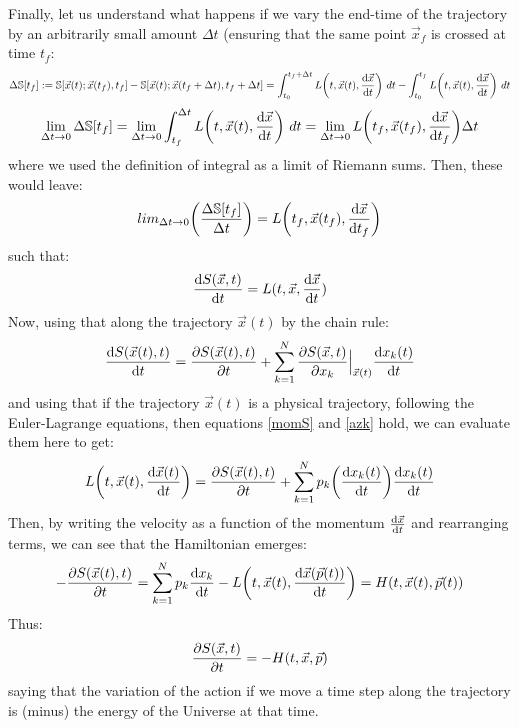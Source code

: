 \documentclass[11pt, a4paper]{article} %
\newcommand{\s}{\mathbb{S}}
\begin{document}
Finally, let us understand what happens if we vary the end-time of the trajectory by an arbitrarily small amount $\Delta t$ (ensuring that the same point $\vec{x}_f$ is crossed at time $t_f$:
\begin{equation}
\Delta \s[t_f]:=\s[\vec{x}(t); \vec{x}(t_f),t_f]-\s[\vec{x}(t); \vec{x}(t_f+\Delta t), t_f+\Delta t]=\int_{t_0}^{t_f+\Delta t} L\qty(t, \vec{x}(t), \dv{\vec{x}}{t})\ dt - \int_{t_0}^{t_f} L\qty(t, \vec{x}(t), \dv{\vec{x}}{t})\ dt
\end{equation}
$$
\lim_{\Delta t\rightarrow 0}\Delta \s[t_f]= \lim_{\Delta t\rightarrow 0}\int_{t_f}^{\Delta t} L\qty(t, \vec{x}(t), \dv{\vec{x}}{t})\ dt=\lim_{\Delta t\rightarrow 0}  L\qty(t_f, \vec{x}(t_f), \dv{\vec{x}}{t_f})\Delta t
$$
where we used the definition of integral as a limit of Riemann sums. Then, these would leave:
\begin{equation}
lim_{\Delta t\rightarrow 0}\qty(\frac{\Delta \s[t_f]}{\Delta t} )= L\qty(t_f, \vec{x}(t_f), \dv{\vec{x}}{t_f})
\end{equation}
such that:
\begin{equation}\label{azk}
\dv{S(\vec{x},t)}{t}=L(t,\vec{x},\dv{\vec{x}}{t})
\end{equation}
Now, using that along the trajectory $\vec{x}(t)$ by the chain rule:
\begin{equation}
\dv{S(\vec{x}(t),t)}{t} = \pdv{S(\vec{x}(t),t)}{t}+\sum_{k=1}^N\pdv{S(\vec{x},t)}{x_k}\Big\rvert_{\vec{x}(t)}\dv{x_k(t)}{t}
\end{equation}
and using that if the trajectory $\vec{x}(t)$ is a physical trajectory, following the Euler-Lagrange equations, then equations \eqref{momS} and \ref{azk} hold, we can evaluate them here to get:
\begin{equation}
L\qty(t, \vec{x}(t), \dv{\vec{x}(t)}{t})=\pdv{S(\vec{x}(t),t)}{t}+\sum_{k=1}^N p_k\qty(\dv{x_k(t)}{t})\dv{x_k(t)}{t}
\end{equation}
Then, by writing the velocity as a function of the momentum $\dv{\vec{x}}{t} (\vec{p})$ and rearranging terms, we can see that the Hamiltonian emerges:
\begin{equation}
-\pdv{S(\vec{x}(t),t)}{t}=\sum_{k=1}^N p_k\dv{x_k}{t} (p_k(t))-L\qty(t, \vec{x}(t), \dv{\vec{x}(\vec{p}(t))}{t})=H(t, \vec{x}(t), \vec{p}(t))
\end{equation}
Thus:
\begin{equation}\label{hamS}
\pdv{S(\vec{x},t)}{t}=-H(t, \vec{x}, \vec{p})
\end{equation}
saying that the variation of the action if we move a time step along the trajectory is (minus) the energy of the Universe at that time.
\end{document}
